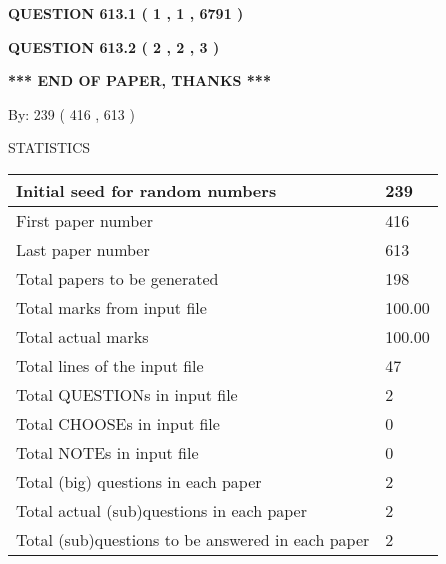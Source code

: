 \documentclass[12pt]{article}
\begin{document}
   
   
   
 \vspace{0.2in}
 
 
 
 
   
   
  
\vspace{0.2in}
  
{\textbf{\Large{QUESTION
613.1 
 ( 1 , 1 , 6791 )
}}}
  
  
  
\vspace{0.2in}
  
{\textbf{\Large{QUESTION
613.2 
 ( 2 , 2 , 3 )
}}}
  
  
   
   
 \vspace{0.2in}
 
   
   
   
   
\vspace{1.0in} 
{\textbf{\large{ *** END OF PAPER, THANKS *** }}} 
   
   
\hspace{1.0in} By: 
 239 ( 416 ,  613 )
   
   
   
\vspace{0.2in}
\vspace{0.2in}
   
   
 \newpage
\setcounter{page}{1} 
   
   
 {\LARGE{STATISTICS}}
   
\vspace{0.2in}
   
 \begin{tabular}{|l|l|}
 \hline
 Initial seed for random numbers & 239  \\
\hline
 First paper number & 416  \\
\hline
 Last  paper number & 613  \\
\hline
 Total papers to be generated & 198  \\
\hline
Total marks from input file & 100.00 \\
\hline
Total actual marks & 100.00 \\
\hline
 Total lines of the input file & 47  \\
 \hline
 Total QUESTIONs in input file & 2  \\
\hline
 Total CHOOSEs in input file & 0  \\
\hline
 Total NOTEs in input file & 0  \\
\hline
 Total (big) questions in each paper & 2  \\
\hline
 Total actual (sub)questions in each paper & 2  \\
\hline
 Total (sub)questions to be answered in each paper & 2  \\
\hline
 \end{tabular}
   
\end{document}
